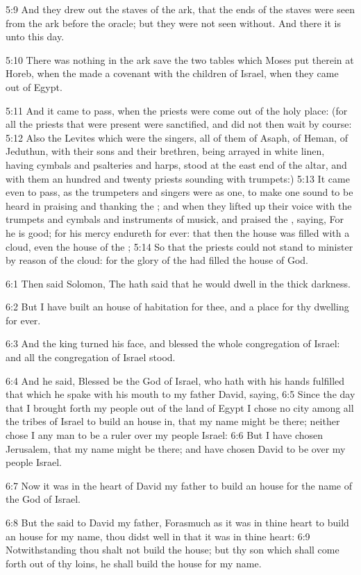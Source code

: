 5:9 And they drew out the staves of the ark, that the ends of the staves were seen from the ark before the oracle; but they were not seen without. And there it is unto this day.

5:10 There was nothing in the ark save the two tables which Moses put therein at Horeb, when the \LORD made a covenant with the children of Israel, when they came out of Egypt.

5:11 And it came to pass, when the priests were come out of the holy place: (for all the priests that were present were sanctified, and did not then wait by course: 5:12 Also the Levites which were the singers, all of them of Asaph, of Heman, of Jeduthun, with their sons and their brethren, being arrayed in white linen, having cymbals and psalteries and harps, stood at the east end of the altar, and with them an hundred and twenty priests sounding with trumpets:) 5:13 It came even to pass, as the trumpeters and singers were as one, to make one sound to be heard in praising and thanking the \LORD; and when they lifted up their voice with the trumpets and cymbals and instruments of musick, and praised the \LORD, saying, For he is good; for his mercy endureth for ever: that then the house was filled with a cloud, even the house of the \LORD; 5:14 So that the priests could not stand to minister by reason of the cloud: for the glory of the \LORD had filled the house of God.

6:1 Then said Solomon, The \LORD hath said that he would dwell in the thick darkness.

6:2 But I have built an house of habitation for thee, and a place for thy dwelling for ever.

6:3 And the king turned his face, and blessed the whole congregation of Israel: and all the congregation of Israel stood.

6:4 And he said, Blessed be the \LORD God of Israel, who hath with his hands fulfilled that which he spake with his mouth to my father David, saying, 6:5 Since the day that I brought forth my people out of the land of Egypt I chose no city among all the tribes of Israel to build an house in, that my name might be there; neither chose I any man to be a ruler over my people Israel: 6:6 But I have chosen Jerusalem, that my name might be there; and have chosen David to be over my people Israel.

6:7 Now it was in the heart of David my father to build an house for the name of the \LORD God of Israel.

6:8 But the \LORD said to David my father, Forasmuch as it was in thine heart to build an house for my name, thou didst well in that it was in thine heart: 6:9 Notwithstanding thou shalt not build the house; but thy son which shall come forth out of thy loins, he shall build the house for my name.

